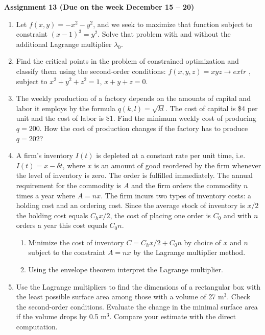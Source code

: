 \documentclass{article}
\begin{document}
\fontsize{14}{21}
\selectfont
\centerline{\textbf{Assignment 13 (Due on the week December 15 -- 20)}}
\fontsize{12}{18}
\selectfont
\begin{enumerate}
\item Let $f(x,y)=-x^2-y^2$, and we seek to maximize that function subject to constraint $(x-1)^3=y^2$. Solve that problem with and without the additional Lagrange multiplier $\lambda_0$.

\item Find the critical points in the problem of constrained optimization and classify them using the second-order conditions: $f(x,y,z)=xyz\rightarrow extr$ , subject to $x^2+y^2+z^2=1$, $x+y+z=0$.

\item The weekly production of a factory depends on the amounts of capital and labor it employs by the formula $q(k,l)=\sqrt{kl}$. The cost of capital is \$4 per unit and the cost of labor is \$1. Find the minimum weekly cost of producing $q=200$. How the cost of production changes if the factory has to produce $q=202$?

\item A firm's inventory $I(t)$ is depleted at a constant rate per unit time, i.e. $I(t)=x-\delta t$, where $x$ is an amount of good reordered by the firm whenever the level of inventory is zero. The order is fulfilled immediately. The annual requirement for the commodity is $A$ and the firm orders the commodity $n$ times a year where $A=nx$. The firm incurs two types of inventory costs: a holding cost and an ordering cost. Since the average stock of inventory is $x/2$ the holding cost equals $C_hx/2$, the cost of placing one order is $C_0$ and with $n$ orders a year this cost equals $C_0n$.
\begin{enumerate} 
\item Minimize the cost of inventory $C=C_hx/2+C_0n$ by choice of $x$ and $n$ subject to the constraint $A=nx$ by the Lagrange multiplier method.
\item Using the envelope theorem interpret the Lagrange multiplier.
\end{enumerate}
\item Use the Lagrange multipliers to find the dimensions of a rectangular box with the least possible surface area among those with a volume of 27 m$^3$. Check the second-order conditions. Evaluate the change in the minimal surface area if the volume drops by 0.5 m$^3$. Compare your estimate with the direct computation.
\end{enumerate}
\end{document}
